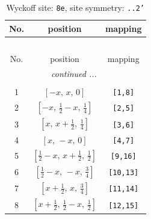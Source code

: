 \documentclass[fleqn,8pt]{jsarticle}
\begin{document}
\begin{longtable}{ccc}
\caption{Wyckoff site: {\tt 8e}, site symmetry: {\tt ..2'}}
 \\
 \hline \hline
No. & position & mapping \\ \hline \endfirsthead

\multicolumn{2}{l}{\tablename\ \thetable{}} \\
 \hline \hline
No. & position & mapping \\ \hline \endhead

 \hline \hline
\multicolumn{2}{r}{\footnotesize\it continued ...} \\ \endfoot

 \hline \hline
\multicolumn{2}{r}{} \\ \endlastfoot

1 & $\left[ - x,\, x,\, 0 \right]$ & {\tt [1,8]} \\ \hline
2 & $\left[ - x,\, \frac{1}{2} - x,\, \frac{1}{4} \right]$ & {\tt [2,5]} \\ \hline
3 & $\left[ x,\, x + \frac{1}{2},\, \frac{1}{4} \right]$ & {\tt [3,6]} \\ \hline
4 & $\left[ x,\, - x,\, 0 \right]$ & {\tt [4,7]} \\ \hline
5 & $\left[ \frac{1}{2} - x,\, x + \frac{1}{2},\, \frac{1}{2} \right]$ & {\tt [9,16]} \\ \hline
6 & $\left[ \frac{1}{2} - x,\, - x,\, \frac{3}{4} \right]$ & {\tt [10,13]} \\ \hline
7 & $\left[ x + \frac{1}{2},\, x,\, \frac{3}{4} \right]$ & {\tt [11,14]} \\ \hline
8 & $\left[ x + \frac{1}{2},\, \frac{1}{2} - x,\, \frac{1}{2} \right]$ & {\tt [12,15]} \\
\end{longtable}
\renewcommand{\arraystretch}{1.2}
\end{document}
